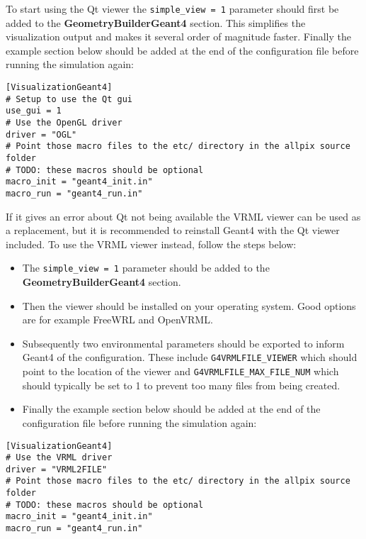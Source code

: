 To start using the Qt viewer the \texttt{simple\_view = 1} parameter should first be added to the \textbf{GeometryBuilderGeant4} section. This simplifies the visualization output and makes it several order of magnitude faster. Finally the example section below should be added at the end of the configuration file before running the simulation again:
\begin{verbatim}
[VisualizationGeant4]
# Setup to use the Qt gui
use_gui = 1
# Use the OpenGL driver
driver = "OGL" 
# Point those macro files to the etc/ directory in the allpix source folder
# TODO: these macros should be optional
macro_init = "geant4_init.in"
macro_run = "geant4_run.in"
\end{verbatim}
If it gives an error about Qt not being available the VRML viewer can be used as a replacement, but it is recommended to reinstall Geant4 with the Qt viewer included. To use the VRML viewer instead, follow the steps below:
\begin{itemize}
\item The \texttt{simple\_view = 1} parameter should be added to the \textbf{GeometryBuilderGeant4} section.
\item Then the viewer should be installed on your operating system. Good options are for example FreeWRL and OpenVRML.
\item Subsequently two environmental parameters should be exported to inform Geant4 of the configuration. These include \texttt{G4VRMLFILE\_VIEWER} which should point to the location of the viewer and \texttt{G4VRMLFILE\_MAX\_FILE\_NUM} which should typically be set to 1 to prevent too many files from being created.
\item Finally the example section below should be added at the end of the configuration file before running the simulation again:
\end{itemize}

\begin{verbatim}
[VisualizationGeant4]
# Use the VRML driver
driver = "VRML2FILE" 
# Point those macro files to the etc/ directory in the allpix source folder
# TODO: these macros should be optional
macro_init = "geant4_init.in"
macro_run = "geant4_run.in"
\end{verbatim}


